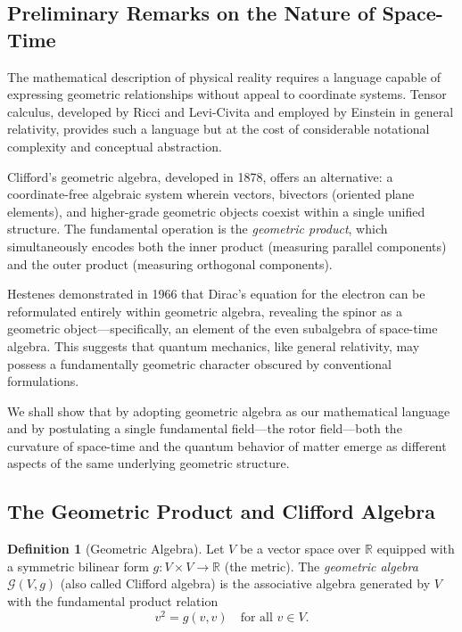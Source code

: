 \documentclass[11pt,a4paper]{article}
\numberwithin{equation}{section}
\theoremstyle{plain}
\theoremstyle{definition}
\newtheorem{definition}[theorem]{Definition}
\theoremstyle{remark}
\newcommand{\R}{\mathbb{R}}
\newcommand{\Cl}{\mathcal{G}}               %
\begin{document}
\subsection{Preliminary Remarks on the Nature of Space-Time}

The mathematical description of physical reality requires a language capable of expressing geometric relationships without appeal to coordinate systems. Tensor calculus, developed by Ricci and Levi-Civita and employed by Einstein in general relativity, provides such a language but at the cost of considerable notational complexity and conceptual abstraction.

Clifford's geometric algebra, developed in 1878, offers an alternative: a coordinate-free algebraic system wherein vectors, bivectors (oriented plane elements), and higher-grade geometric objects coexist within a single unified structure. The fundamental operation is the \emph{geometric product}, which simultaneously encodes both the inner product (measuring parallel components) and the outer product (measuring orthogonal components).

Hestenes demonstrated in 1966 that Dirac's equation for the electron can be reformulated entirely within geometric algebra, revealing the spinor as a geometric object—specifically, an element of the even subalgebra of space-time algebra. This suggests that quantum mechanics, like general relativity, may possess a fundamentally geometric character obscured by conventional formulations.

We shall show that by adopting geometric algebra as our mathematical language and by postulating a single fundamental field—the rotor field—both the curvature of space-time and the quantum behavior of matter emerge as different aspects of the same underlying geometric structure.

\subsection{The Geometric Product and Clifford Algebra}

\begin{definition}[Geometric Algebra]
Let $V$ be a vector space over $\R$ equipped with a symmetric bilinear form $g: V \times V \to \R$ (the metric). The \emph{geometric algebra} $\Cl(V,g)$ (also called Clifford algebra) is the associative algebra generated by $V$ with the fundamental product relation
\begin{equation}
v^2 = g(v,v) \quad \text{for all } v \in V.
\label{eq:fundamental-relation}
\end{equation}
\end{definition}
\end{document}

